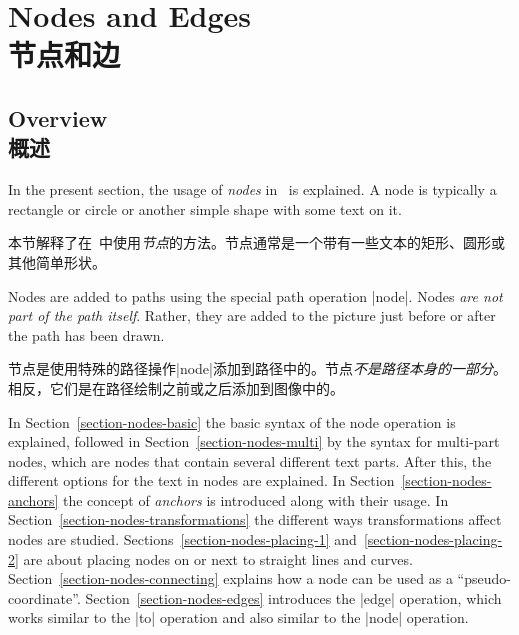 \setcounter{section}{16}
\setcounter{subsection}{5}
\setcounter{subsubsection}{5}

%
%
%


\section{Nodes and Edges\\节点和边}
\label{section-nodes}

\subsection{Overview\\概述}

In the present section, the usage of \emph{nodes} in \tikzname\ is explained. A
node is typically a rectangle or circle or another simple shape with some text
on it.

本节解释了在\tikzname\ 中使用\emph{节点}的方法。节点通常是一个带有一些文本的矩形、圆形或其他简单形状。

Nodes are added to paths using the special path operation |node|. Nodes
\emph{are not part of the path itself}. Rather, they are added to the picture
just before or after the path has been drawn.

节点是使用特殊的路径操作|node|添加到路径中的。节点\emph{不是路径本身的一部分}。相反，它们是在路径绘制之前或之后添加到图像中的。

In Section~\ref{section-nodes-basic} the basic syntax of the node operation is
explained, followed in Section~\ref{section-nodes-multi} by the syntax for
multi-part nodes, which are nodes that contain several different text parts.
After this, the different options for the text in nodes are explained. In
Section~\ref{section-nodes-anchors} the concept of \emph{anchors} is introduced
along with their usage. In Section~\ref{section-nodes-transformations} the
different ways transformations affect nodes are studied.
Sections~\ref{section-nodes-placing-1} and~\ref{section-nodes-placing-2} are
about placing nodes on or next to straight lines and curves.
Section~\ref{section-nodes-connecting} explains how a node can be used as a
``pseudo-coordinate''. Section~\ref{section-nodes-edges} introduces the |edge|
operation, which works similar to the |to| operation and also similar to the
|node| operation.

